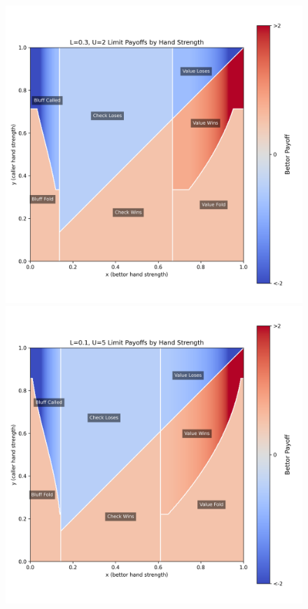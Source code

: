 \documentclass[../../main/main.tex]{subfiles}
\begin{document}
\begin{figure}[h!]
\begin{adjustwidth}{-1in}{-1in}
\begin{minipage}{0.4\textwidth}
        \end{minipage}
        \vspace{-0.5cm}\\ %
        \begin{minipage}{0.4\textwidth}
            \centering
            \includegraphics[width=\textwidth]{images/LU_payoffs_0.3_2.png}
        \end{minipage}
        \hspace{0.02\textwidth}
        \begin{minipage}{0.4\textwidth}
            \centering
            \includegraphics[width=\textwidth]{images/LU_payoffs_0.1_5.png}

\end{minipage}
\end{adjustwidth}
\end{figure}
\end{document}
